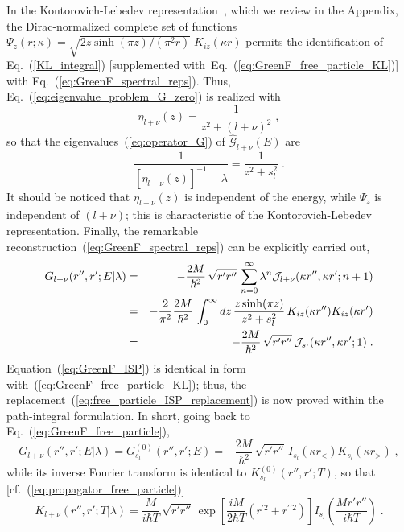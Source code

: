\documentclass[a4paper,preprint,draft,showpacs,amsmath,amsfonts,amssymb,aps,prd]{revtex4}%
\begin{document}
In the Kontorovich-Lebedev representation~\cite{kontorovich},
which we review in the Appendix,
the Dirac-normalized complete set of functions
$
\Psi_{z} (r;\kappa)
=
\sqrt{  2 z \sinh ( \pi z ) /(\pi^{2}  r )  }
\;
K_{iz} (\kappa r) $
permits the identification of 
Eq.~(\ref{KL_integral})  
[supplemented with~Eq.~(\ref{eq:GreenF_free_particle_KL})]
with Eq.~(\ref{eq:GreenF_spectral_reps}). 
Thus,
Eq.~(\ref{eq:eigenvalue_problem_G_zero}) 
is realized with
\begin{equation}
 \eta_{l+\nu}(z)
 = 
\frac{1}{z^{2} + (l+\nu)^{2} }
\;  ,
\label{eq:GreenF_order_zero_eigenvalues}
\end{equation}
so that the eigenvalues~(\ref{eq:operator_G}) of 
$\hat{ {\mathcal G}}_{l+\nu} (E)$
are 
\begin{equation}
\frac{1}{
\left[ \eta_{l+\nu}(z) \right]^{-1}
- \lambda }
= 
\frac{1}{
z^{2} + s_{l}^{2}
}
\;  .
\label{eq:GreenF_eigenvalues}
\end{equation}
It should be noticed that
$ \eta_{l+\nu}(z)$ is independent of the energy, while
$\Psi_{z}$ is independent of $(l+\nu)$;
this is characteristic of the  Kontorovich-Lebedev representation.
Finally,
the remarkable reconstruction~(\ref{eq:GreenF_spectral_reps}) can be explicitly carried out,
\begin{eqnarray}
G_{l+\nu} (r'',r';E| \lambda) 
& = &
 - 
 \frac{2M}{\hbar^{2}} \,
\sqrt{ r'r''} \,
\sum_{n=0}^{\infty}
\lambda^{n}
{\cal J}_{l+\nu} (\kappa r'',\kappa r'; n + 1)
\nonumber \\
& = &
 - \frac{2}{\pi^{2}}
 \frac{2M}{\hbar^{2}} \,
\int_{0}^{\infty}  dz \, 
\frac{ z \sinh ( \pi z )}{  z^{2} + s_{l}^{2} }
\,
K_{iz} (\kappa r'') K_{iz} (\kappa r')
\label{eq:GreenF_KL}
\\
& = &
-
 \frac{2M}{\hbar^{2}} \,
\sqrt{ r'r''} \,
{\cal J}_{s_{l}} (\kappa r'',\kappa r'; 1)
\;     .
\label{eq:GreenF_ISP}
\end{eqnarray}
Equation~(\ref{eq:GreenF_ISP}) 
is identical in form with~(\ref{eq:GreenF_free_particle_KL}); thus, the
replacement~(\ref{eq:free_particle_ISP_replacement})
is now proved  within the path-integral formulation.
 In short, going back to Eq.~(\ref{eq:GreenF_free_particle}), 
\begin{equation}
G_{l+\nu} (r'',r';E| \lambda) 
=  G^{(0)}_{s_{l}} (r'',r';E) 
=
- \frac{2M}{\hbar^{2}} \,
\sqrt{ r'r''} \,
I_{s_{l}}( \kappa r_{<} ) K_{s_{l}} (\kappa r_{>} )
\; ,
\label{eq:GreenF_ISP2}
\end{equation}
while its
inverse Fourier transform %
is identical to $K^{(0)}_{s_{l}} (r'',r';T)  $, so that
[cf.~(\ref{eq:propagator_free_particle})]
\begin{equation}
K_{l+\nu} (r'',r';T | \lambda) 
=
\frac{M}{i \hbar T} 
\,
\sqrt{ r' r''} 
\,
\exp \left[ \frac{i M}{2 \hbar T} \left(r^{\prime 2} + r^{\prime \prime 2} 
\right) \right]
I_{s_{l}} \left( \frac{Mr'r''}{i \hbar T} \right)
\; .
\label{eq:propagator_ISP}
\end{equation}
\end{document}
